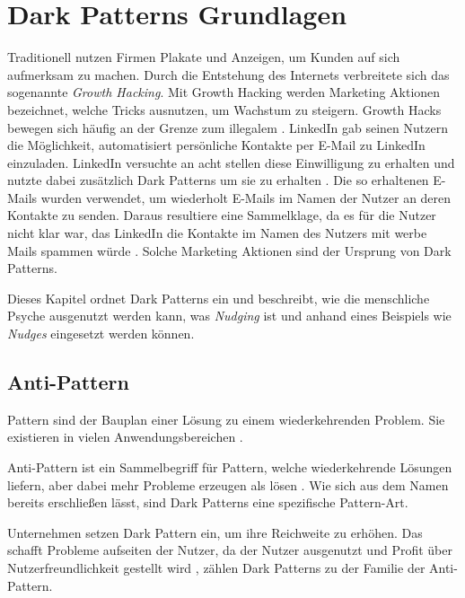 \documentclass[conference,compsoc,final,a4paper]{IEEEtran}
\begin{document}
\section{Dark Patterns Grundlagen}
\label{chap:Grundlagen}

Traditionell nutzen Firmen Plakate und Anzeigen, um Kunden auf sich aufmerksam zu machen. Durch die Entstehung des Internets verbreitete sich das sogenannte \textit{Growth Hacking}. Mit Growth Hacking werden Marketing Aktionen bezeichnet, welche Tricks ausnutzen, um Wachstum zu steigern. Growth Hacks bewegen sich häufig an der Grenze zum illegalem  \autocite{Narayanan2020}. LinkedIn gab seinen Nutzern die Möglichkeit, automatisiert persönliche Kontakte per E-Mail zu LinkedIn einzuladen. LinkedIn versuchte an acht stellen diese Einwilligung zu erhalten und nutzte dabei zusätzlich Dark Patterns um sie zu erhalten \autocite{Schlosser2015}. Die so erhaltenen E-Mails wurden verwendet, um wiederholt E-Mails im Namen der Nutzer an deren Kontakte zu senden. Daraus resultiere eine Sammelklage, da es für die Nutzer nicht klar war, das LinkedIn die Kontakte im Namen des Nutzers mit werbe Mails spammen würde \autocite{Strange2015}. Solche Marketing Aktionen sind der Ursprung von Dark Patterns.

Dieses Kapitel ordnet Dark Patterns ein und beschreibt, wie die menschliche Psyche ausgenutzt werden kann, was \textit{Nudging} ist und anhand eines Beispiels wie \textit{Nudges} eingesetzt werden können.
\subsection{Anti-Pattern}
Pattern sind der Bauplan einer Lösung zu einem wiederkehrenden Problem. Sie existieren in vielen Anwendungsbereichen \autocite[S. 1]{MacDonald2019}.

Anti-Pattern ist ein Sammelbegriff für Pattern, welche wiederkehrende Lösungen liefern, aber dabei mehr Probleme erzeugen als lösen \autocite[S. 193-195]{MacDonald2019}. Wie sich aus dem Namen bereits erschließen lässt, sind Dark Patterns eine spezifische Pattern-Art.

Unternehmen setzen Dark Pattern ein, um ihre Reichweite zu erhöhen. Das schafft Probleme aufseiten der Nutzer, da der Nutzer ausgenutzt und Profit über Nutzerfreundlichkeit gestellt wird \autocite{Chivukula_2019}, zählen Dark Patterns zu der Familie der Anti-Pattern.
\end{document}
